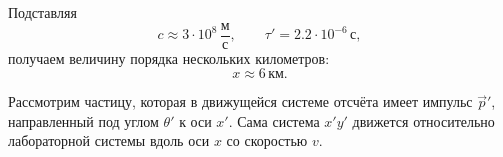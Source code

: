 \documentclass[../final.tex]{subfiles}
\begin{document}
Подставляя
%
\begin{equation*}
    c
    \approx
    3\cdot10^8\,
    \frac{\text{м}}{\text{с}},
    \qquad
    \tau'
    =
    2.2\cdot10^{-6}\,\text{с},
\end{equation*}
%
получаем величину порядка нескольких километров:
%
\begin{equation*}
    x
    \approx
    6\,\text{км}.
\end{equation*}



\newpage
{}

\condition

Рассмотрим частицу, которая в движущейся системе отсчёта имеет
импульс $\vec p'$, направленный под углом $\theta'$ к оси $x'$.
Сама система $x'y'$ движется относительно лабораторной системы
вдоль оси $x$ со скоростью $v$.
\end{document}
